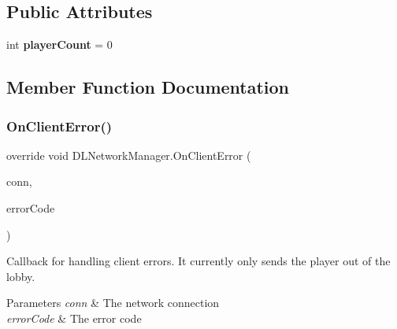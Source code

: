 \subsection*{Public Attributes}
\begin{DoxyCompactItemize}
\item 
\hypertarget{class_d_l_network_manager_a5749ce538520b4d00d44853e7c24673f}{}\label{class_d_l_network_manager_a5749ce538520b4d00d44853e7c24673f} 
int {\bfseries player\+Count} = 0
\end{DoxyCompactItemize}


\subsection{Member Function Documentation}
\hypertarget{class_d_l_network_manager_a30212d32bdb0338d43148e8a65ef77a2}{}\label{class_d_l_network_manager_a30212d32bdb0338d43148e8a65ef77a2} 
\subsubsection{\texorpdfstring{On\+Client\+Error()}{OnClientError()}}
{\footnotesize\ttfamily override void D\+L\+Network\+Manager.\+On\+Client\+Error (\begin{DoxyParamCaption}\item[{Network\+Connection}]{conn,  }\item[{int}]{error\+Code }\end{DoxyParamCaption})}



Callback for handling client errors. It currently only sends the player out of the lobby. 


\begin{DoxyParams}{Parameters}
{\em conn} & The network connection\\
\hline
{\em error\+Code} & The error code\\
\hline
\end{DoxyParams}
\hypertarget{class_d_l_network_manager_a0b8e454879f6d7cae15e71d2bce54816}{}\label{class_d_l_network_manager_a0b8e454879f6d7cae15e71d2bce54816} 
